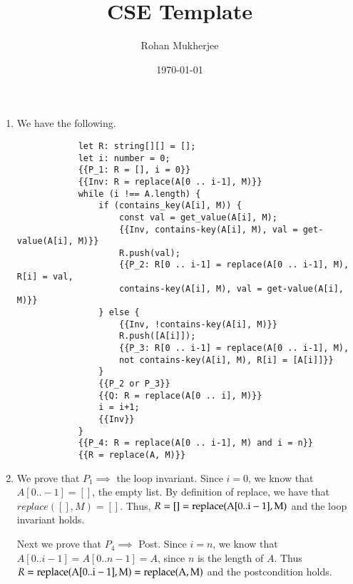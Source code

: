 \documentclass[12pt]{article}
\title{CSE Template}
\date{\today}
\author{Rohan Mukherjee}
\theoremstyle{definitionstyle}
\begin{document}
    \maketitle
    \begin{enumerate}[leftmargin=0pt, label=(\alph*), labelindent=0pt, labelwidth=!, wide]
        \item We have the following.
        
        \begin{lstlisting}
            let R: string[][] = [];
            let i: number = 0;
            {{P_1: R = [], i = 0}}
            {{Inv: R = replace(A[0 .. i-1], M)}}
            while (i !== A.length) {
                if (contains_key(A[i], M)) {
                    const val = get_value(A[i], M);
                    {{Inv, contains-key(A[i], M), val = get-value(A[i], M)}}
                    R.push(val);
                    {{P_2: R[0 .. i-1] = replace(A[0 .. i-1], M), R[i] = val, 
                    contains-key(A[i], M), val = get-value(A[i], M)}}
                } else {
                    {{Inv, !contains-key(A[i], M)}}
                    R.push([A[i]]);
                    {{P_3: R[0 .. i-1] = replace(A[0 .. i-1], M), 
                    not contains-key(A[i], M), R[i] = [A[i]]}}
                }
                {{P_2 or P_3}}
                {{Q: R = replace(A[0 .. i], M)}}
                i = i+1;
                {{Inv}}
            }
            {{P_4: R = replace(A[0 .. i-1], M) and i = n}}
            {{R = replace(A, M)}}
        \end{lstlisting}

        \item We prove that $P_1 \implies $ the loop invariant. Since $i = 0$, we know that $A[0 .. -1] = []$, the empty list. By definition of replace, we have that $replace([], M) = []$. Thus, $R = [] = \rm replace(A[0 .. i-1], M)$ and the loop invariant holds.
        
        Next we prove that $P_4 \implies $ Post. Since $i = n$, we know that $A[0 .. i-1] = A[0 .. n-1] = A$, since $n$ is the length of $A$. Thus $R = \rm replace(A[0 .. i-1], M) = replace(A, M)$ and the postcondition holds.
        

\end{enumerate}
\end{document}
